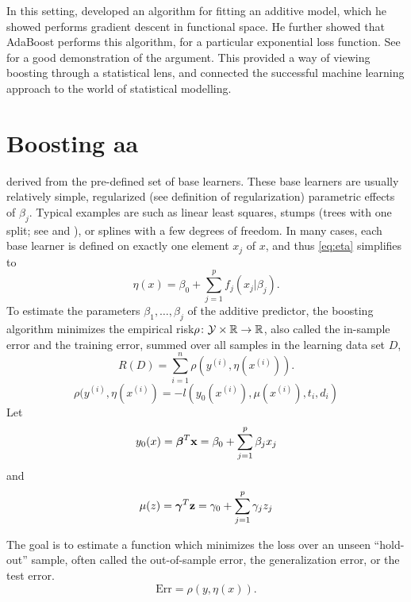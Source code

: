 In this setting, \citet{friedman2000} developed an algorithm for fitting an additive model, which he showed performs gradient descent in functional space. He further showed that AdaBoost performs this algorithm, for a particular exponential loss function. See \citet{ESL} for a good demonstration of the argument. This provided a way of viewing boosting through a statistical lens, and connected the successful machine learning approach to the world of statistical modelling.

\section{Boosting aa}
derived from the pre-defined set of base learners.
These base learners are usually relatively simple, regularized (see definition of regularization) parametric effects of $\beta_j$. Typical examples are such as linear least squares, stumps (trees with one split; see \citet{buhlmann2007} and \citet{ESL}), or splines with a few degrees of freedom. In many cases, each base learner is defined on exactly one element $x_j$ of $x$, and thus \eqref{eq:eta} simplifies to
\begin{equation}\label{eq:eta-componentwise}
    \eta(x)=\beta_0+\sum_{j=1}^pf_j(x_j|\beta_j).
\end{equation}
To estimate the parameters $\beta_1,\ldots,\beta_j$ of the additive predictor, the boosting algorithm minimizes the empirical risk$\rho\colon\mathcal{Y}\times\mathbb{R}\to\mathbb{R}$, also called the in-sample error and the training error, summed over all samples in the learning data set $D$,
\begin{equation}\label{eq:empirical-risk}
    R(D)=\sum_{i=1}^n\rho(y^{(i)},\eta(x^{(i)})).
\end{equation}
\begin{equation}
    \rho(y^{(i)},\eta(x^{(i)})=-l(y_0(x^{(i)}), \mu(x^{(i)}), t_i, d_i)
\end{equation}
Let
\begin{equation}
    y_0(x)=\boldsymbol{\beta}^T\mathbf{x}=\beta_0+\sum_{j=1}^p \beta_jx_j
\end{equation}
and
\begin{equation}
    \mu(z)=\boldsymbol{\gamma}^T\mathbf{z}=\gamma_0+\sum_{j=1}^p \gamma_jz_j
\end{equation}

The goal is to estimate a function which minimizes the loss over an unseen ``hold-out'' sample, often called the out-of-sample error, the generalization error, or the test error.
\begin{equation}
    \text{Err}=\rho(y,\eta(x)).
\end{equation}

